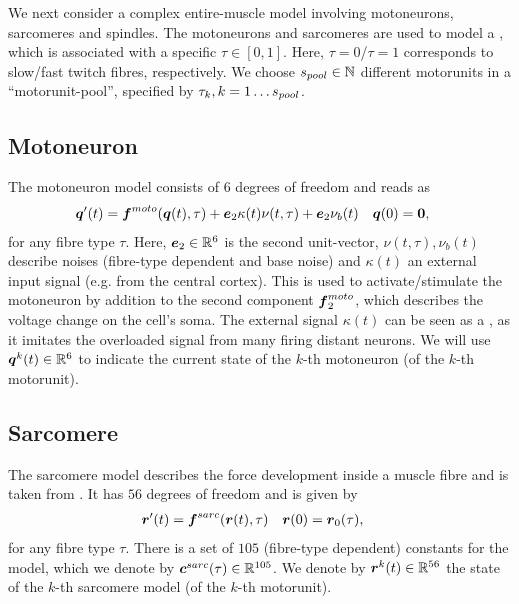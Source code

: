 We next consider a complex entire-muscle model involving motoneurons, sarcomeres and spindles.
The motoneurons and sarcomeres are used to model a , which is associated with a specific  $\tau\in[0,1]$.
Here, $\tau=0$/$\tau=1$ corresponds to slow/fast twitch fibres, respectively.
We choose ${s_{pool}}\in \mathbb{N}$ different motorunits in a ``motorunit-pool'', specified by $\tau_k,k=1\ldots{s_{pool}}$.

\subsection{Motoneuron}
\cite{Cisi2008, negro2011}
The motoneuron model consists of $6$ degrees of freedom and reads as
\begin{align}
	\boldsymbol{q}'(t) &= \boldsymbol{f}^{moto}(\boldsymbol{q}(t),\tau) + \boldsymbol{e}_2\kappa(t)\nu(t,\tau) + \boldsymbol{e}_2\nu_b(t) & \boldsymbol{q}(0) &= \boldsymbol{0},
\end{align}
for any fibre type $\tau$.
Here, $\boldsymbol{e}_2\in\mathbb{R}^6$ is the second unit-vector, $\nu(t,\tau),\nu_b(t)$ describe noises (fibre-type dependent and base noise)
and $\kappa(t)$ an external input signal (e.g. from the central cortex).
This is used to activate/stimulate the motoneuron by addition to the second component $\boldsymbol{f}^{moto}_2$, which describes the voltage change on the cell's soma.
The external signal $\kappa(t)$ can be seen as a , as it imitates the overloaded signal from many firing distant neurons.
We will use $\boldsymbol{q}^k(t) \in \mathbb{R}^6$ to indicate the current state of the $k$-th motoneuron (of the $k$-th motorunit).


\subsection{Sarcomere}
The sarcomere model describes the force development inside a muscle fibre and is taken from \cite{Shorten2007}.
It has $56$ degrees of freedom and is given by
\begin{align}
	\boldsymbol{r}'(t) &= \boldsymbol{f}^{sarc}(\boldsymbol{r}(t),\tau) & \boldsymbol{r}(0) &= \boldsymbol{r}_0(\tau),
\end{align}
for any fibre type $\tau$.
There is a set of $105$ (fibre-type dependent) constants for the model, which we denote by $\boldsymbol{c}^{sarc}(\tau)\in\mathbb{R}^{105}$.
We denote by $\boldsymbol{r}^k(t)\in\mathbb{R}^{56}$ the state of the $k$-th sarcomere model (of the $k$-th motorunit).

